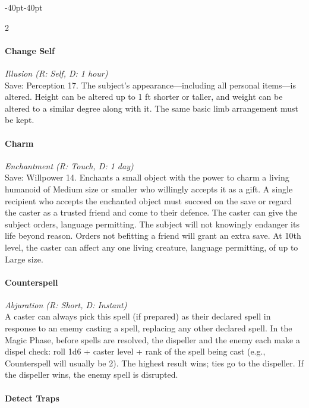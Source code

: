 \documentclass{book}
\begin{document}
\begin{adjustwidth}{-40pt}{-40pt}
\begin{multicols}{2}
\paragraph{Change Self}\label{change-self}

\emph{Illusion (R: Self, D: 1 hour)}\\
Save: Perception 17. The subject's appearance---including all personal
items---is altered. Height can be altered up to 1 ft shorter or taller,
and weight can be altered to a similar degree along with it. The same
basic limb arrangement must be kept.

\paragraph{Charm}\label{charm}

\emph{Enchantment (R: Touch, D: 1 day)}\\
Save: Willpower 14. Enchants a small object with the power to charm a
living humanoid of Medium size or smaller who willingly accepts it as a
gift. A single recipient who accepts the enchanted object must succeed
on the save or regard the caster as a trusted friend and come to their
defence. The caster can give the subject orders, language permitting.
The subject will not knowingly endanger its life beyond reason. Orders
not befitting a friend will grant an extra save. At 10th level, the
caster can affect any one living creature, language permitting, of up to
Large size.

\paragraph{Counterspell}\label{counterspell}

\emph{Abjuration (R: Short, D: Instant)}\\
A caster can always pick this spell (if prepared) as their declared
spell in response to an enemy casting a spell, replacing any other
declared spell. In the Magic Phase, before spells are resolved, the
dispeller and the enemy each make a dispel check: roll 1d6 + caster
level + rank of the spell being cast (e.g., Counterspell will usually be
2). The highest result wins; ties go to the dispeller. If the dispeller
wins, the enemy spell is disrupted.

\paragraph{Detect Traps}\label{detect-traps}


\end{multicols}
\end{adjustwidth}
\end{document}
